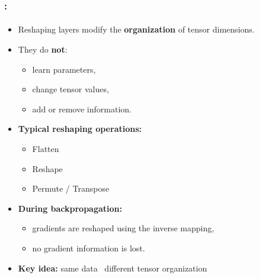 \documentclass[xcolor=table]{beamer}
\begin{document}
\begin{frame}
	\frametitle{\insertshortsubtitle: \insertsection}
	\framesubtitle{\insertsubsection}
	
	\begin{itemize}
		
		\item Reshaping layers modify the \textbf{organization} of tensor dimensions.
		
		\item They do \textbf{not}:
		\begin{itemize}
			\item learn parameters,
			\item change tensor values,
			\item add or remove information.
		\end{itemize}
		
		\item \textbf{Typical reshaping operations:}
		\begin{itemize}
			\item Flatten
			\item Reshape
			\item Permute / Transpose
		\end{itemize}
		
		\item \textbf{During backpropagation:}
		\begin{itemize}
			\item gradients are reshaped using the inverse mapping,
			\item no gradient information is lost.
		\end{itemize}
		
		\item \textbf{Key idea:} same data \textleftarrow\ different tensor organization
		
	\end{itemize}
	
\end{frame}
\end{document}
